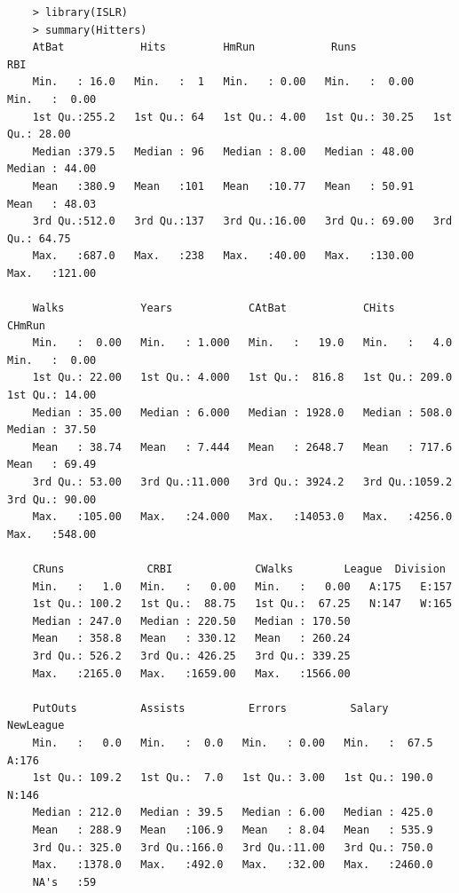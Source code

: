 \documentclass{article}
\begin{document}
\begin{program}
	\begin{verbatim}
	> library(ISLR)
	> summary(Hitters)
	AtBat            Hits         HmRun            Runs             RBI        
	Min.   : 16.0   Min.   :  1   Min.   : 0.00   Min.   :  0.00   Min.   :  0.00  
	1st Qu.:255.2   1st Qu.: 64   1st Qu.: 4.00   1st Qu.: 30.25   1st Qu.: 28.00  
	Median :379.5   Median : 96   Median : 8.00   Median : 48.00   Median : 44.00  
	Mean   :380.9   Mean   :101   Mean   :10.77   Mean   : 50.91   Mean   : 48.03  
	3rd Qu.:512.0   3rd Qu.:137   3rd Qu.:16.00   3rd Qu.: 69.00   3rd Qu.: 64.75  
	Max.   :687.0   Max.   :238   Max.   :40.00   Max.   :130.00   Max.   :121.00  
	
	Walks            Years            CAtBat            CHits            CHmRun      
	Min.   :  0.00   Min.   : 1.000   Min.   :   19.0   Min.   :   4.0   Min.   :  0.00  
	1st Qu.: 22.00   1st Qu.: 4.000   1st Qu.:  816.8   1st Qu.: 209.0   1st Qu.: 14.00  
	Median : 35.00   Median : 6.000   Median : 1928.0   Median : 508.0   Median : 37.50  
	Mean   : 38.74   Mean   : 7.444   Mean   : 2648.7   Mean   : 717.6   Mean   : 69.49  
	3rd Qu.: 53.00   3rd Qu.:11.000   3rd Qu.: 3924.2   3rd Qu.:1059.2   3rd Qu.: 90.00  
	Max.   :105.00   Max.   :24.000   Max.   :14053.0   Max.   :4256.0   Max.   :548.00  
	
	CRuns             CRBI             CWalks        League  Division
	Min.   :   1.0   Min.   :   0.00   Min.   :   0.00   A:175   E:157   
	1st Qu.: 100.2   1st Qu.:  88.75   1st Qu.:  67.25   N:147   W:165   
	Median : 247.0   Median : 220.50   Median : 170.50                   
	Mean   : 358.8   Mean   : 330.12   Mean   : 260.24                   
	3rd Qu.: 526.2   3rd Qu.: 426.25   3rd Qu.: 339.25                   
	Max.   :2165.0   Max.   :1659.00   Max.   :1566.00                   
	
	PutOuts          Assists          Errors          Salary       NewLeague
	Min.   :   0.0   Min.   :  0.0   Min.   : 0.00   Min.   :  67.5   A:176    
	1st Qu.: 109.2   1st Qu.:  7.0   1st Qu.: 3.00   1st Qu.: 190.0   N:146    
	Median : 212.0   Median : 39.5   Median : 6.00   Median : 425.0            
	Mean   : 288.9   Mean   :106.9   Mean   : 8.04   Mean   : 535.9            
	3rd Qu.: 325.0   3rd Qu.:166.0   3rd Qu.:11.00   3rd Qu.: 750.0            
	Max.   :1378.0   Max.   :492.0   Max.   :32.00   Max.   :2460.0            
	NA's   :59                
	\end{verbatim}
\end{program}
\end{document}
